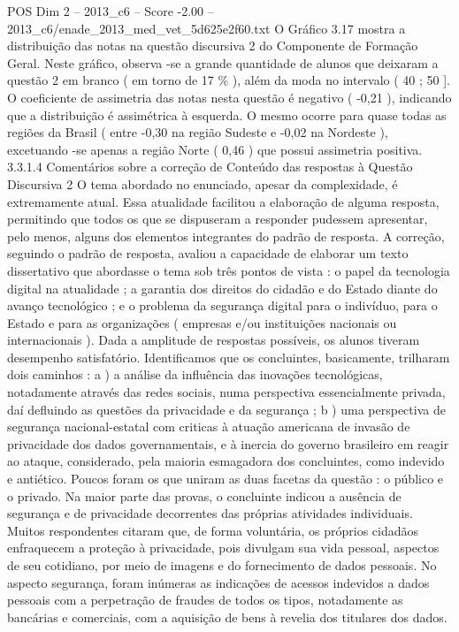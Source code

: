 \begin{textsample}{POS Dim 2 – 2013\_c6 – Score -2.00 – 2013\_c6/enade\_2013\_med\_vet\_5d625e2f60.txt}
O Gráfico 3.17 mostra a distribuição das notas na questão discursiva 2 do Componente de Formação Geral.
Neste gráfico, observa -se a grande quantidade de alunos que deixaram a questão 2 em branco ( em torno de 17 \% ), além da moda no intervalo ( 40 ; 50 ].
O coeficiente de assimetria das notas nesta questão é negativo ( -0,21 ), indicando que a distribuição é assimétrica à esquerda.
O mesmo ocorre para quase todas as regiões da Brasil ( entre -0,30 na região Sudeste e -0,02 na Nordeste ), excetuando -se apenas a região Norte ( 0,46 ) que possui assimetria positiva. 3.3.1.4 Comentários sobre a correção de Conteúdo das respostas à Questão Discursiva 2 O tema abordado no enunciado, apesar da complexidade, é extremamente atual.
Essa atualidade facilitou a elaboração de alguma resposta, permitindo que todos os que se dispuseram a responder pudessem apresentar, pelo menos, alguns dos elementos integrantes do padrão de resposta.
A correção, seguindo o padrão de resposta, avaliou a capacidade de elaborar um texto dissertativo que abordasse o tema sob três pontos de vista : o papel da tecnologia digital na atualidade ; a garantia dos direitos do cidadão e do Estado diante do avanço tecnológico ; e o problema da segurança digital para o indivíduo, para o Estado e para as organizações ( empresas e/ou instituições nacionais ou internacionais ).
Dada a amplitude de respostas possíveis, os alunos tiveram desempenho satisfatório.
Identificamos que os concluintes, basicamente, trilharam dois caminhos : a ) a análise da influência das inovações tecnológicas, notadamente através das redes sociais, numa perspectiva essencialmente privada, daí defluindo as questões da privacidade e da segurança ; b ) uma perspectiva de segurança nacional-estatal com criticas à atuação americana de invasão de privacidade dos dados governamentais, e à inercia do governo brasileiro em reagir ao ataque, considerado, pela maioria esmagadora dos concluintes, como indevido e antiético.
Poucos foram os que uniram as duas facetas da questão : o público e o privado.
Na maior parte das provas, o concluinte indicou a ausência de segurança e de privacidade decorrentes das próprias atividades individuais.
Muitos respondentes citaram que, de forma voluntária, os próprios cidadãos enfraquecem a proteção à privacidade, pois divulgam sua vida pessoal, aspectos de seu cotidiano, por meio de imagens e do fornecimento de dados pessoais.
No aspecto segurança, foram inúmeras as indicações de acessos indevidos a dados pessoais com a perpetração de fraudes de todos os tipos, notadamente as bancárias e comerciais, com a aquisição de bens à revelia dos titulares dos dados.

\end{textsample}
